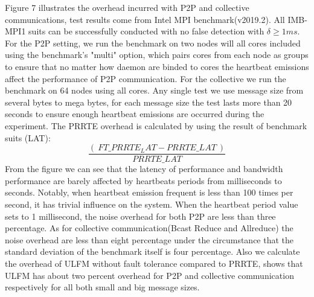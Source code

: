 \documentclass[sigconf]{acmart}
\newcommand{\prrte}[0]{\textsc{PRRTE}\xspace}
\newcommand{\ulfm}[0]{\textsc{ULFM}\xspace}
\begin{document}
Figure 7 illustrates the overhead incurred with P2P and collective communications, test results come from Intel MPI benchmark(v2019.2). All IMB-MPI1 suits can be successfully conducted with no false detection with $ \delta \geq 1 ms $. For the P2P setting, we run the benchmark on two nodes will all cores included using the benchmark's "multi" option, which pairs cores from each node as groups to ensure that no matter how daemon are binded to cores the heartbeat emissions affect the performance of P2P communication. For the collective we run the benchmark on 64 nodes using all cores. Any single test we use message size from several bytes to mega bytes, for each message size the test lasts more than 20 seconds to ensure enough heartbeat emissions are occurred during the experiment. The \prrte overhead is calculated by using the result of benchmark suits (LAT): 
\begin{equation}
\frac{(\ {FT\_PRRTE_LAT - PRRTE\_LAT}\ )}{PRRTE\_LAT} 
\end{equation}
 From the figure we can see that the latency of performance and bandwidth performance are barely affected by heartbeats periods from milliseconds to seconds. Notably, when heartbeat emission frequent is less than 100 times per second, it has trivial influence on the system. When the heartbeat period value sets to 1 millisecond, the noise overhead for both P2P are less than three percentage. As for collective communication(Bcast Reduce and Allreduce) the noise overhead are less than eight percentage under the circumstance that the standard deviation of the benchmark itself is four percentage. Also we calculate the overhead of \ulfm without fault tolerance compared to \prrte, shows that \ulfm has about two percent overhead for P2P and collective communication respectively for all both small and big message sizes.
\end{document}
